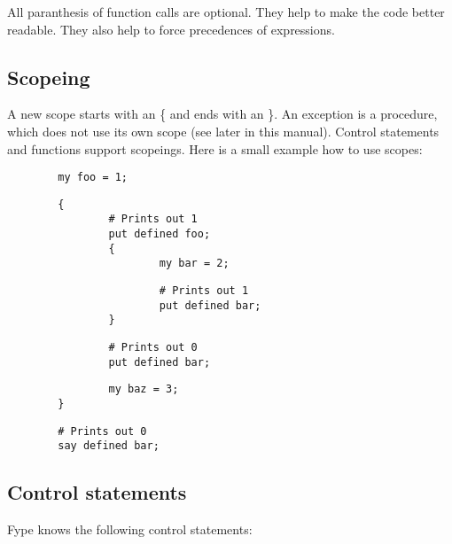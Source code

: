All paranthesis of function calls are optional. They help to make the code better readable. They also help to force precedences of expressions.

\subsection*{Scopeing\label{Scopeing}}


A new scope starts with an \{ and ends with an \}. An exception is a procedure, which does not use its own scope (see later in this manual). Control statements and functions support scopeings. Here is a small example how to use scopes:

\begin{verbatim}
        my foo = 1;
\end{verbatim}
\begin{verbatim}
        {
                # Prints out 1
                put defined foo;
                {
                        my bar = 2;
\end{verbatim}
\begin{verbatim}
                        # Prints out 1
                        put defined bar;
                }
\end{verbatim}
\begin{verbatim}
                # Prints out 0
                put defined bar;
\end{verbatim}
\begin{verbatim}
                my baz = 3;
        }
\end{verbatim}
\begin{verbatim}
        # Prints out 0
        say defined bar;
\end{verbatim}
\subsection*{Control statements\label{Control_statements}}


Fype knows the following control statements:

